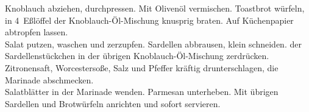 
      \begin{zubereitung}
        Knoblauch abziehen, durchpressen. Mit Olivenöl vermischen. Toastbrot
	würfeln, in 4~Eßlöffel der Knoblauch-Öl-Mischung knusprig braten. Auf
	Küchenpapier abtropfen lassen. \\
	Salat putzen, waschen und zerzupfen. Sardellen abbrausen, klein
	schneiden. \brzd{} der Sardellenstückchen in der übrigen
	Knoblauch-Öl-Mischung zerdrücken. Zitronensaft, Worcestersoße, Salz und
	Pfeffer kräftig drunterschlagen, die Marinade abschmecken. \\
	Salatblätter in der Marinade wenden. Parmesan unterheben. Mit übrigen
	Sardellen und Brotwürfeln anrichten und sofort servieren. \\
      \end{zubereitung}



